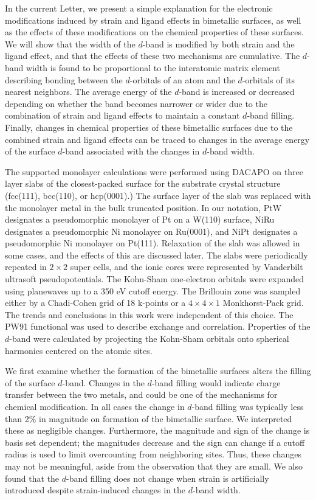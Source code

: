 \documentclass[aps,prl,twocolumn,superscriptaddress,showkeys]{revtex4}
\begin{document}
In the current Letter, we present a simple explanation for the
electronic modifications induced by strain and ligand effects in
bimetallic surfaces, as well as the effects of these modifications on
the chemical properties of these surfaces. We will show that the width
of the $d$-band is modified by both strain and the ligand effect, and
that the effects of these two mechanisms are cumulative.  The $d$-band
width is found to be proportional to the interatomic matrix element
describing bonding between the $d$-orbitals of an atom and the
$d$-orbitals of its nearest neighbors. The average energy of the $d$-band is
increased or decreased depending on whether the band becomes narrower
or wider due to the combination of strain and ligand effects to
maintain a constant $d$-band filling. Finally,  changes in chemical
properties of these bimetallic surfaces due to the combined strain and
ligand effects can be traced to changes in the average energy of the
surface $d$-band associated with the changes in $d$-band width.

The supported monolayer calculations were performed using DACAPO on
three layer slabs of the closest-packed surface for the substrate crystal
structure (fcc(111), bcc(110), or hcp(0001).) The surface
layer of the slab was replaced with the monolayer metal in the bulk
truncated position.  In our notation, PtW designates a pseudomorphic
monolayer of Pt on a W(110) surface, NiRu designates a pseudomorphic
Ni monolayer on Ru(0001), and NiPt designates a pseudomorphic Ni
monolayer on Pt(111).  Relaxation of the slab was allowed in some
cases, and the effects of this are discussed later.  The slabs were
periodically repeated in $2\times2$ super cells, and the ionic cores
were represented by Vanderbilt ultrasoft pseudopotentials.  The
Kohn-Sham one-electron orbitals were expanded using planewaves up to a
350 eV cutoff energy.  The Brillouin zone was sampled either by a
Chadi-Cohen grid of 18 k-points or a $4\times4\times1$ Monkhorst-Pack
grid. The trends and conclusions in this work were independent of this
choice.  The PW91 functional was used to describe exchange and
correlation. Properties of the $d$-band were calculated by projecting
the Kohn-Sham orbitals onto spherical harmonics centered on the atomic
sites.

We first examine whether the formation of the bimetallic surfaces
alters the filling of the surface $d$-band. Changes in the $d$-band
filling would indicate charge transfer between the two metals, and
could be one of the mechanisms for chemical modification.  In all
cases the change in $d$-band filling was typically less than 2\% in
magnitude on formation of the bimetallic surface. We interpreted these
as negligible changes.  Furthermore, the magnitude and sign of the
change is basis set dependent; the magnitudes decrease and the sign
can change if a cutoff radius is used to limit overcounting from
neighboring sites. Thus, these changes may not be meaningful, aside
from the observation that they are small. We also found that the
$d$-band filling does not change when strain is artificially introduced
 despite strain-induced changes in the $d$-band width.
\end{document}
